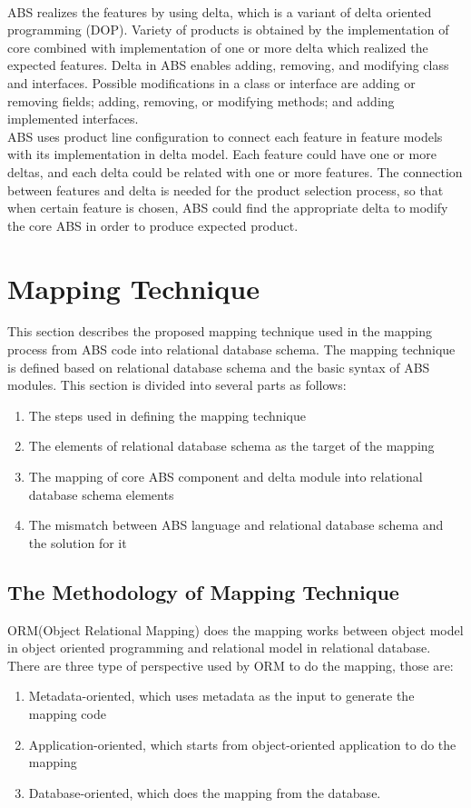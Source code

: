 \documentclass[conference]{IEEEtran}
\begin{document}
\\
ABS realizes the features by using delta, which is a variant of delta oriented programming (DOP). Variety of products is obtained by the implementation of core combined with implementation of one or more delta which realized the expected features. Delta in ABS enables adding, removing, and modifying class and interfaces. Possible modifications in a class or interface are adding or removing fields; adding, removing, or modifying methods; and adding implemented interfaces.
\\
ABS uses product line configuration to connect each feature in feature models with its implementation in delta model. Each feature could have one or more deltas, and each delta could be related with one or more features. The connection between features and delta is needed for the product selection process, so that when certain feature is chosen, ABS could find the appropriate delta to modify the core ABS in order to produce expected product.


\section{Mapping Technique}
This section describes the proposed mapping technique used in the mapping process from ABS code into relational database schema. The mapping technique is defined based on relational database schema and the basic syntax of ABS modules. This section is divided into several parts as follows:
\begin{enumerate}
	\item The steps used in defining the mapping technique
	\item The elements of relational database schema as the target of the mapping
	\item The mapping of core ABS component and delta module into relational database schema elements
	\item The mismatch between ABS language and relational database schema and the solution for it
\end{enumerate}

\subsection{The Methodology of Mapping Technique}
ORM(Object Relational Mapping) does the mapping works between object model in object oriented programming and relational model in relational database. There are three type of perspective used by ORM to do the mapping, those are:
\begin{enumerate}
	\item Metadata-oriented, which uses metadata as the input to generate the mapping code
	\item Application-oriented, which starts from object-oriented application to do the mapping
	\item Database-oriented, which does the mapping from the database.
\end{enumerate}
\end{document}
